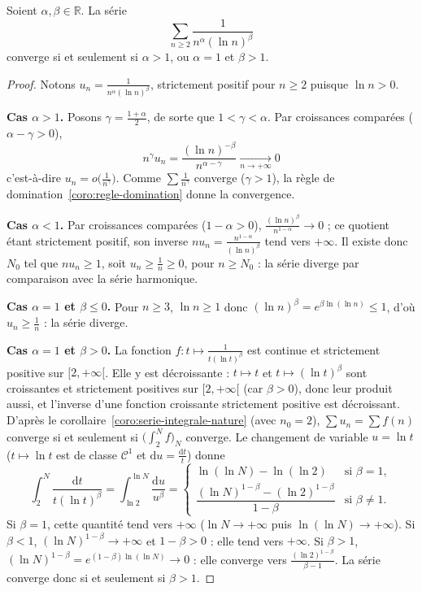 \begin{theo}
\label{theo:bertrand}
Soient $\alpha,\beta\in\mathbb{R}$. La série
\[\sum_{n\geq 2}\frac{1}{n^\alpha(\ln n)^\beta}\]
converge si et seulement si $\alpha>1$, ou $\alpha=1$ et $\beta>1$.
\end{theo}

\begin{proof}
Notons $u_n=\frac{1}{n^\alpha(\ln n)^\beta}$, strictement positif pour $n\geq 2$ puisque $\ln n>0$.

\textbf{Cas $\alpha>1$.} Posons $\gamma=\frac{1+\alpha}{2}$, de sorte que $1<\gamma<\alpha$. Par croissances comparées ($\alpha-\gamma>0$),
\[n^\gamma u_n=\frac{(\ln n)^{-\beta}}{n^{\alpha-\gamma}}\xrightarrow[n\to+\infty]{}0\]
c'est-à-dire $u_n=o\big(\frac{1}{n^\gamma}\big)$. Comme $\sum\frac{1}{n^\gamma}$ converge ($\gamma>1$), la règle de domination~\ref{coro:regle-domination} donne la convergence.

\textbf{Cas $\alpha<1$.} Par croissances comparées ($1-\alpha>0$), $\frac{(\ln n)^\beta}{n^{1-\alpha}}\to 0$ ; ce quotient étant strictement positif, son inverse $nu_n=\frac{n^{1-\alpha}}{(\ln n)^\beta}$ tend vers $+\infty$. Il existe donc $N_0$ tel que $nu_n\geq 1$, soit $u_n\geq\frac1n\geq 0$, pour $n\geq N_0$ : la série diverge par comparaison avec la série harmonique.

\textbf{Cas $\alpha=1$ et $\beta\leq 0$.} Pour $n\geq 3$, $\ln n\geq 1$ donc $(\ln n)^\beta=e^{\beta\ln(\ln n)}\leq 1$, d'où $u_n\geq\frac1n$ : la série diverge.

\textbf{Cas $\alpha=1$ et $\beta>0$.} La fonction $f:t\mapsto\frac{1}{t(\ln t)^\beta}$ est continue et strictement positive sur $[2,+\infty[$. Elle y est décroissante : $t\mapsto t$ et $t\mapsto(\ln t)^\beta$ sont croissantes et strictement positives sur $[2,+\infty[$ (car $\beta>0$), donc leur produit aussi, et l'inverse d'une fonction croissante strictement positive est décroissant. D'après le corollaire~\ref{coro:serie-integrale-nature} (avec $n_0=2$), $\sum u_n=\sum f(n)$ converge si et seulement si $\big(\int_2^Nf\big)_N$ converge. Le changement de variable $u=\ln t$ ($t\mapsto\ln t$ est de classe $\mathcal{C}^1$ et $\mathrm{d}u=\frac{\mathrm{d}t}{t}$) donne
\[\int_{2}^{N}\frac{\mathrm{d}t}{t(\ln t)^\beta}=\int_{\ln 2}^{\ln N}\frac{\mathrm{d}u}{u^\beta}=\begin{cases}\ln(\ln N)-\ln(\ln 2) & \text{si }\beta=1,\\[4pt] \dfrac{(\ln N)^{1-\beta}-(\ln 2)^{1-\beta}}{1-\beta} & \text{si }\beta\neq 1.\end{cases}\]
Si $\beta=1$, cette quantité tend vers $+\infty$ ($\ln N\to+\infty$ puis $\ln(\ln N)\to+\infty$). Si $\beta<1$, $(\ln N)^{1-\beta}\to+\infty$ et $1-\beta>0$ : elle tend vers $+\infty$. Si $\beta>1$, $(\ln N)^{1-\beta}=e^{(1-\beta)\ln(\ln N)}\to 0$ : elle converge vers $\frac{(\ln 2)^{1-\beta}}{\beta-1}$. La série converge donc si et seulement si $\beta>1$.
\end{proof}

